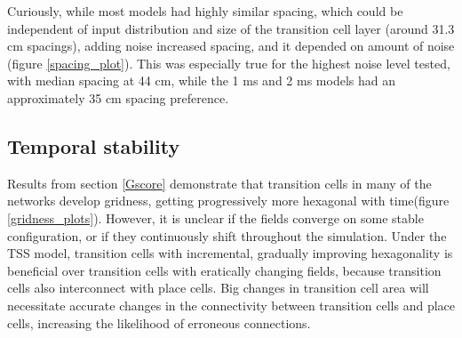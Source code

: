 \documentclass{article}
\begin{document}
    Curiously, while most models had highly similar spacing, which could be independent of input distribution and size of the transition cell layer (around 31.3 cm spacings), adding noise increased spacing, and it depended on amount of noise (figure \ref{spacing_plot}). This was especially true for the highest noise level tested, with median spacing at 44 cm, while the 1 ms and 2 ms models had an approximately 35 cm spacing preference.

    \subsection{Temporal stability} \label{TempStab}

    Results from section \ref{Gscore} demonstrate that transition cells in many of the networks develop gridness, getting progressively more hexagonal with time(figure \ref{gridness_plots}). However, it is unclear if the fields converge on some stable configuration, or if they continuously shift throughout the simulation. Under the TSS model, transition cells with incremental, gradually improving hexagonality is beneficial over transition cells with eratically changing fields, because transition cells also interconnect with place cells. Big changes in transition cell area will necessitate accurate changes in the connectivity between transition cells and place cells, increasing the likelihood of erroneous connections.
\end{document}
